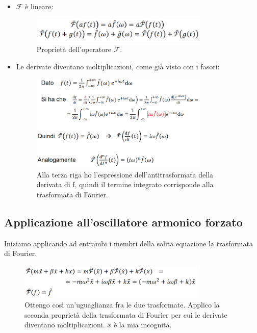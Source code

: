 \begin{itemize}
	
	\item \(\mathcal{F} \) è lineare:
	\begin{figure}[H]
		\centering
		\includegraphics[width=0.8\textwidth]{2024-03-07-09-40-06.png}
		\caption{Proprietà dell'operatore \(\mathcal{F} \). }
	\end{figure}
	
	\item Le derivate diventano moltiplicazioni, come già visto con i fasori:
	\begin{figure}[H]
		\centering
		\includegraphics[width=0.8\textwidth]{2024-03-07-09-41-51.png}
		\caption{Alla terza riga ho l'espressione dell'antitrasformata della derivata di f, quindi il termine integrato corrisponde alla trasformata di Fourier.}
	\end{figure}
\end{itemize}

\subsection{Applicazione all'oscillatore armonico forzato}

Iniziamo applicando ad entrambi i membri della solita equazione la trasformata di Fourier.

\begin{figure}[H]
	\centering
	\includegraphics[width=0.8\textwidth]{2024-03-07-09-46-30.png}
	\caption{Ottengo così un'uguaglianza fra le due trasformate. Applico la seconda proprietà della trasformata di Fourier per cui le derivate diventano moltiplicazioni. \(\widetilde{x} \) è la mia incognita. }
\end{figure}

